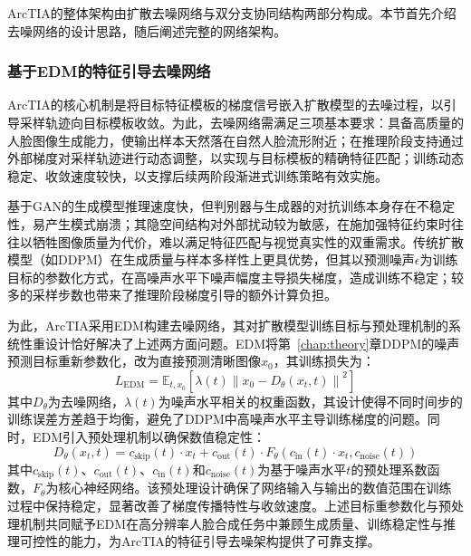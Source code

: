 ArcTIA的整体架构由扩散去噪网络与双分支协同结构两部分构成。本节首先介绍去噪网络的设计思路，随后阐述完整的网络架构。

\subsubsection{基于EDM的特征引导去噪网络}

ArcTIA的核心机制是将目标特征模板的梯度信号嵌入扩散模型的去噪过程，以引导采样轨迹向目标模板收敛。为此，去噪网络需满足三项基本要求：具备高质量的人脸图像生成能力，使输出样本天然落在自然人脸流形附近；在推理阶段支持通过外部梯度对采样轨迹进行动态调整，以实现与目标模板的精确特征匹配；训练动态稳定、收敛速度较快，以支撑后续两阶段渐进式训练策略有效实施。

基于GAN的生成模型推理速度快，但判别器与生成器的对抗训练本身存在不稳定性，易产生模式崩溃；其隐空间结构对外部扰动较为敏感，在施加强特征约束时往往以牺牲图像质量为代价，难以满足特征匹配与视觉真实性的双重需求。传统扩散模型（如DDPM\cite{ho2020denoising}）在生成质量与样本多样性上更具优势，但其以预测噪声$\epsilon$为训练目标的参数化方式，在高噪声水平下噪声幅度主导损失梯度，造成训练不稳定；较多的采样步数也带来了推理阶段梯度引导的额外计算负担。

为此，ArcTIA采用EDM\cite{karras2022elucidating}构建去噪网络，其对扩散模型训练目标与预处理机制的系统性重设计恰好解决了上述两方面问题。EDM将第~\ref{chap:theory}章DDPM的噪声预测目标重新参数化，改为直接预测清晰图像$x_0$，其训练损失为：
\begin{equation}\label{eq:edm_loss}
      L_{\text{EDM}} = \mathbb{E}_{t,x_0}\left[\lambda(t)\left\|x_0 - D_\theta(x_t,t)\right\|^2\right]
\end{equation}
其中$D_\theta$为去噪网络，$\lambda(t)$为噪声水平相关的权重函数，其设计使得不同时间步的训练误差方差趋于均衡，避免了DDPM中高噪声水平主导训练梯度的问题。同时，EDM引入预处理机制以确保数值稳定性：
\begin{equation}\label{eq:edm_preconditioning}
      D_\theta(x_t,t) = c_{\text{skip}}(t)\cdot x_t + c_{\text{out}}(t)\cdot F_\theta(c_{\text{in}}(t)\cdot x_t, c_{\text{noise}}(t))
\end{equation}
其中$c_{\text{skip}}(t)$、$c_{\text{out}}(t)$、$c_{\text{in}}(t)$和$c_{\text{noise}}(t)$为基于噪声水平$t$的预处理系数函数，$F_\theta$为核心神经网络。该预处理设计确保了网络输入与输出的数值范围在训练过程中保持稳定，显著改善了梯度传播特性与收敛速度。上述目标重参数化与预处理机制共同赋予EDM在高分辨率人脸合成任务中兼顾生成质量、训练稳定性与推理可控性的能力，为ArcTIA的特征引导去噪架构提供了可靠支撑。

